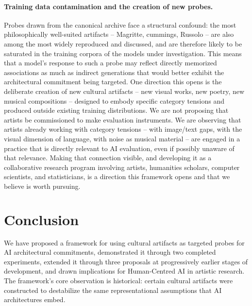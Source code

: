 \documentclass[
  twocolumn,
]{ceurart}
\begin{document}
\paragraph{Training data contamination and the creation of new probes.}
Probes drawn from the canonical archive face a structural confound: the most philosophically well-suited artifacts -- Magritte, cummings, Russolo -- are also among the most widely reproduced and discussed, and are therefore likely to be saturated in the training corpora of the models under investigation. This means that a model's response to such a probe may reflect directly memorized associations as much as indirect generations that would better exhibit the architectural commitment being targeted. One direction this opens is the deliberate creation of new cultural artifacts -- new visual works, new poetry, new musical compositions -- designed to embody specific category tensions and produced outside existing training distributions. We are not proposing that artists be commissioned to make evaluation instruments. We are observing that artists already working with category tensions -- with image/text gaps, with the visual dimension of language, with noise as musical material -- are engaged in a practice that is directly relevant to AI evaluation, even if possibly unaware of that relevance. Making that connection visible, and developing it as a collaborative research program involving artists, humanities scholars, computer scientists, and statisticians, is a direction this framework opens and that we believe is worth pursuing.

\section{Conclusion}

We have proposed a framework for using cultural artifacts as targeted probes for AI architectural commitments, demonstrated it through two completed experiments, extended it through three proposals at progressively earlier stages of development, and drawn implications for Human-Centred AI in artistic research. The framework's core observation is historical: certain cultural artifacts were constructed to destabilize the same representational assumptions that AI architectures embed.
\end{document}
